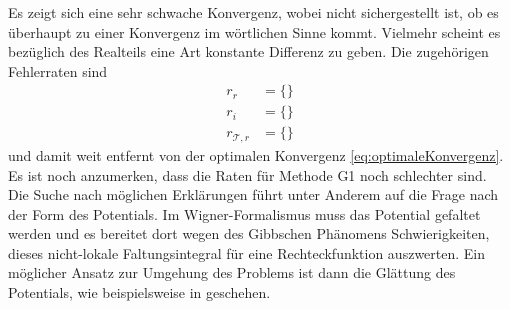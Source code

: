 Es zeigt sich eine sehr schwache Konvergenz, wobei nicht sichergestellt ist, ob es überhaupt zu einer Konvergenz im wörtlichen Sinne kommt. Vielmehr scheint es bezüglich des Realteils eine Art konstante Differenz zu geben. Die zugehörigen Fehlerraten sind
\begin{equation*}
  \begin{aligned}
    r_r &= \{\} \\
    r_i &= \{\} \\
    r_{\mathcal{T},r} &= \{\}
  \end{aligned}
\end{equation*}
und damit weit entfernt von der optimalen Konvergenz \eqref{eq:optimaleKonvergenz}. Es ist noch anzumerken, dass die Raten für Methode G1 noch schlechter sind. Die Suche nach möglichen Erklärungen führt unter Anderem auf die Frage nach der Form des Potentials. Im Wigner-Formalismus muss das Potential gefaltet werden und es bereitet dort wegen des Gibbschen Phänomens Schwierigkeiten, dieses nicht-lokale Faltungsintegral für eine Rechteckfunktion auszwerten. Ein möglicher Ansatz zur Umgehung des Problems ist dann die Glättung des Potentials, wie beispielsweise in \cite{wiedenhaus} geschehen.

